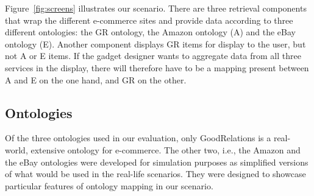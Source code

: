 Figure~\ref{fig:screens} illustrates our scenario. There are three retrieval components that wrap the different e-commerce sites and provide data according to three different ontologies: the GR ontology, the Amazon ontology (A) and the eBay ontology (E). Another component displays GR items for display to the user, but not A or E items. If the gadget designer wants to aggregate data from all three services in the display, there will therefore have to be a mapping present between A and E on the one hand, and GR on the other.



\subsection{Ontologies}
\label{ontologies}
Of the three ontologies used in our evaluation, only GoodRelations is a real-world, extensive ontology for e-commerce. The other two, i.e., the Amazon and the eBay ontologies were developed for simulation purposes as simplified versions of what would be used in the real-life scenarios. They were designed to showcase particular features of ontology mapping in our scenario.

